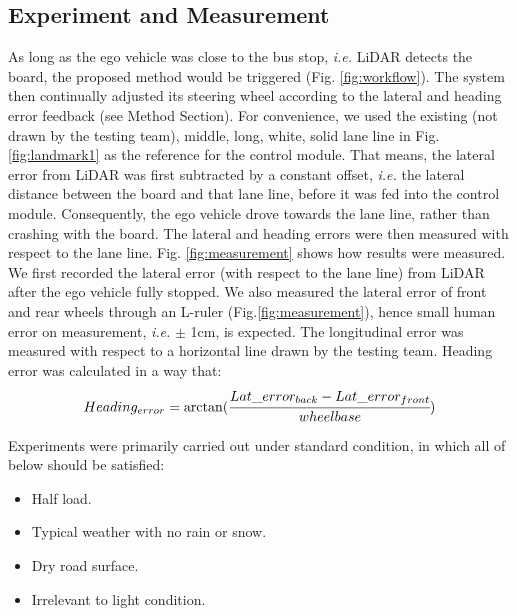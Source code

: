 \documentclass[letterpaper, 10 pt, conference]{ieeeconf}
\begin{document}
\subsection{Experiment and Measurement}
As long as the ego vehicle was close to the bus stop, \textit{i.e.} LiDAR detects the board, the proposed method would be triggered (Fig. \ref{fig:workflow}). 
The system then continually adjusted its steering wheel according to the lateral and heading error feedback (see Method Section). For convenience, we used the existing (not drawn by the testing team), middle, long, white, solid lane line in Fig. \ref{fig:landmark1} as the reference for the control module. 
That means, the lateral error from LiDAR was first subtracted by a constant offset, \textit{i.e.} the lateral distance between the board and that lane line, before it was fed into the control module. 
Consequently, the ego vehicle drove towards the lane line, rather than crashing with the board. The lateral and heading errors were then measured with respect to the lane line. Fig. \ref{fig:measurement} shows how results were measured. 
We first recorded the lateral error (with respect to the lane line) from LiDAR after the ego vehicle fully stopped. We also measured the lateral error of front and rear wheels through an L-ruler (Fig.\ref{fig:measurement}), hence small human error on measurement, \textit{i.e.} $\pm$ 1cm, is expected. 
The longitudinal error was measured with respect to a horizontal line drawn by the testing team. Heading error was calculated in a way that:
\begin{equation}
Heading_{error} = \arctan (\cfrac{Lat\_error_{back} - Lat\_error_{front}}{wheelbase})
\label{eq:heading_error}
\end{equation}

Experiments were primarily carried out under standard condition, in which all of below should be satisfied: 
\begin{itemize} 
\item Half load.
\item Typical weather with no rain or snow.
\item Dry road surface.
\item Irrelevant to light condition.
\end{itemize}
\end{document}
